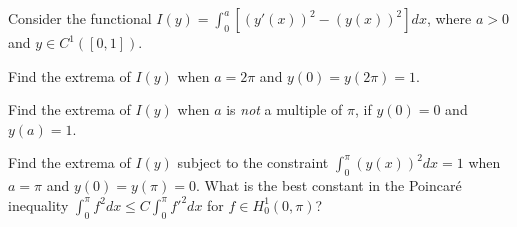 Consider the functional $I(y)=\int_{0}^a[(y'(x))^2-(y(x))^2]dx$, where
$a>0$ and $y\in C^1([0,1])$.
\begin{alist}
\item Find the extrema of $I(y)$ when $a=2\pi$ and $y(0)=y(2\pi)=1$.
\item Find the extrema of $I(y)$ when $a$ is \emph{not} a multiple of
$\pi$, if $y(0)=0$ and $y(a)=1$.
\item Find the extrema of $I(y)$ subject to the constraint
$\int_0^{\pi}(y(x))^2dx=1$ when $a=\pi$ and $y(0)=y(\pi)=0$. What is
the best constant in the Poincar\'e inequality $\int_{0}^{\pi}f^2
dx\leq C \int_0^{\pi}f'^2 dx$ for $f\in H_0^1(0,\pi)$?
\end{alist}
